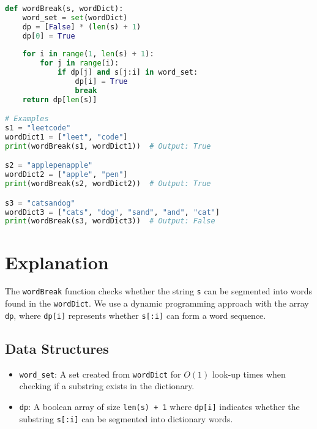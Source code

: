 \begin{fullwidth}
\begin{lstlisting}[language=Python]
def wordBreak(s, wordDict):
    word_set = set(wordDict)
    dp = [False] * (len(s) + 1)
    dp[0] = True
    
    for i in range(1, len(s) + 1):
        for j in range(i):
            if dp[j] and s[j:i] in word_set:
                dp[i] = True
                break
    return dp[len(s)]

# Examples
s1 = "leetcode"
wordDict1 = ["leet", "code"]
print(wordBreak(s1, wordDict1))  # Output: True

s2 = "applepenapple"
wordDict2 = ["apple", "pen"]
print(wordBreak(s2, wordDict2))  # Output: True

s3 = "catsandog"
wordDict3 = ["cats", "dog", "sand", "and", "cat"]
print(wordBreak(s3, wordDict3))  # Output: False
\end{lstlisting}
\end{fullwidth}

\section*{Explanation}

The \texttt{wordBreak} function checks whether the string \texttt{s} can be segmented into words found in the \texttt{wordDict}. We use a dynamic programming approach with the array \texttt{dp}, where \texttt{dp[i]} represents whether \texttt{s[:i]} can form a word sequence.

\subsection*{Data Structures}
\begin{itemize}
    \item \texttt{word\_set}:  
    A set created from \texttt{wordDict} for \(O(1)\) look-up times when checking if a substring exists in the dictionary.
    
    \item \texttt{dp}:  
    A boolean array of size \texttt{len(s) + 1} where \texttt{dp[i]} indicates whether the substring \texttt{s[:i]} can be segmented into dictionary words.
\end{itemize}

